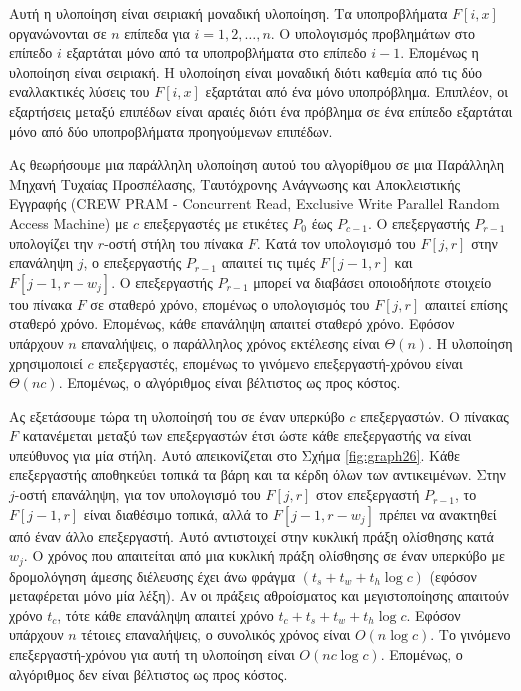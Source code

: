 \documentclass[12pt,a4paper]{article} %
\begin{document}
{{Αυτή η υλοποίηση είναι σειριακή μοναδική υλοποίηση. Τα υποπροβλήματα
$F[i, x]$ οργανώνονται σε $n$ επίπεδα για $i = 1, 2, \ldots, n$.
Ο υπολογισμός προβλημάτων στο επίπεδο $i$ εξαρτάται μόνο από τα
υποπροβλήματα στο επίπεδο $i - 1$. Επομένως η υλοποίηση είναι
σειριακή. Η υλοποίηση είναι μοναδική διότι καθεμία από τις δύο
εναλλακτικές λύσεις του $F[i, x]$ εξαρτάται από ένα μόνο υποπρόβλημα.
Επιπλέον, οι εξαρτήσεις μεταξύ επιπέδων είναι αραιές διότι ένα
πρόβλημα σε ένα επίπεδο εξαρτάται μόνο από δύο υποπροβλήματα
προηγούμενων επιπέδων.

Ας θεωρήσουμε μια παράλληλη υλοποίηση αυτού του αλγορίθμου σε μια 
Παράλληλη Μηχανή Τυχαίας Προσπέλασης, Ταυτόχρονης Ανάγνωσης και 
Αποκλειστικής Εγγραφής (CREW PRAM - 
Concurrent Read, Exclusive Write Parallel Random Access Machine) 
με $c$ επεξεργαστές με ετικέτες $P_0$ έως $P_{c-1}$.
Ο επεξεργαστής $P_{r-1}$ υπολογίζει την $r$-οστή στήλη του πίνακα
$F$. Κατά τον υπολογισμό του $F[j, r]$ στην επανάληψη $j$, ο
επεξεργαστής $P_{r-1}$ απαιτεί τις τιμές $F[j-1, r]$ και
$F[j-1, r-w_j]$. Ο επεξεργαστής $P_{r-1}$ μπορεί να διαβάσει
οποιοδήποτε στοιχείο του πίνακα $F$ σε σταθερό χρόνο, επομένως ο
υπολογισμός του $F[j, r]$ απαιτεί επίσης σταθερό χρόνο. Επομένως,
κάθε επανάληψη απαιτεί σταθερό χρόνο. Εφόσον υπάρχουν $n$ επαναλήψεις, 
ο παράλληλος χρόνος εκτέλεσης είναι $\Theta(n)$. Η υλοποίηση χρησιμοποιεί 
$c$ επεξεργαστές, επομένως το γινόμενο επεξεργαστή-χρόνου είναι 
$\Theta(nc)$. Επομένως, ο αλγόριθμος είναι βέλτιστος ως προς κόστος.

Ας εξετάσουμε τώρα τη υλοποίησή του σε έναν υπερκύβο $c$
επεξεργαστών. Ο πίνακας $F$ κατανέμεται μεταξύ των επεξεργαστών
έτσι ώστε κάθε επεξεργαστής να είναι υπεύθυνος για μία στήλη. Αυτό
απεικονίζεται στο Σχήμα \ref{fig:graph26}. Κάθε επεξεργαστής αποθηκεύει τοπικά τα
βάρη και τα κέρδη όλων των αντικειμένων. Στην $j$-οστή επανάληψη,
για τον υπολογισμό του $F[j, r]$ στον επεξεργαστή $P_{r-1}$, το
$F[j-1, r]$ είναι διαθέσιμο τοπικά, αλλά το $F[j-1, r-w_j]$ πρέπει
να ανακτηθεί από έναν άλλο επεξεργαστή. Αυτό αντιστοιχεί στην
κυκλική πράξη ολίσθησης κατά $w_j$.
Ο χρόνος που απαιτείται από μια κυκλική πράξη ολίσθησης σε έναν
υπερκύβο με δρομολόγηση άμεσης διέλευσης έχει άνω φράγμα
$(t_s + t_w + t_h \log c)$ (εφόσον μεταφέρεται μόνο μία λέξη). Αν
οι πράξεις αθροίσματος και μεγιστοποίησης απαιτούν χρόνο $t_c$, τότε
κάθε επανάληψη απαιτεί χρόνο $t_c + t_s + t_w + t_h \log c$. Εφόσον
υπάρχουν $n$ τέτοιες επαναλήψεις, ο συνολικός χρόνος είναι
$O(n \log c)$. Το γινόμενο επεξεργαστή-χρόνου για αυτή τη υλοποίηση
είναι $O(nc \log c)$. Επομένως, ο αλγόριθμος δεν είναι βέλτιστος ως
προς κόστος.

}}
\end{document}
